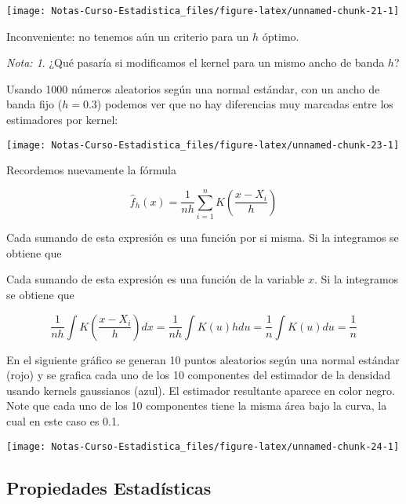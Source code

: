 \documentclass[
  12pt,
]{book}
\theoremstyle{definition}
\theoremstyle{definition}
\theoremstyle{definition}
\theoremstyle{definition}
\theoremstyle{remark}
\newtheorem*{remark}{Nota: }
\begin{document}
\begin{center}\texttt{[image: Notas-Curso-Estadistica\_files/figure-latex/unnamed-chunk-21-1]} \end{center}

Inconveniente: no tenemos aún un criterio para un \(h\) óptimo.

\begin{remark}
¿Qué pasaría si modificamos el kernel para un mismo ancho de banda \(h\)?
\end{remark}

Usando 1000 números aleatorios según una normal estándar, con un ancho de banda fijo (\(h=0.3\)) podemos ver que no hay diferencias muy marcadas entre los estimadores por kernel:

\begin{center}\texttt{[image: Notas-Curso-Estadistica\_files/figure-latex/unnamed-chunk-23-1]} \end{center}

Recordemos nuevamente la fórmula

\begin{equation*}
\hat{f}_{h}\left( x \right) = \frac{1}{nh}\sum_{i=1}^{n} K\left( \frac{x-X_{i}}{h} \right)
\end{equation*}

Cada sumando de esta expresión es una función por si misma. Si la
integramos se obtiene que

Cada sumando de esta expresión es una función de la variable \(x\). Si la integramos se obtiene que

\begin{equation*}
\frac{1}{nh}\int K\left( \frac{x-X_{i}}{h} \right) dx
= \frac{1}{nh} \int K\left( u \right) h du
= \frac{1}{n} \int K(u) du
= \frac{1}{n}
\end{equation*}

En el siguiente gráfico se generan 10 puntos aleatorios según una normal estándar (rojo) y se grafica cada uno de los 10 componentes del estimador de la densidad usando kernels gaussianos (azul). El estimador resultante aparece en color negro. Note que cada uno de los 10 componentes tiene la misma área bajo la curva, la cual en este caso es 0.1.

\begin{center}\texttt{[image: Notas-Curso-Estadistica\_files/figure-latex/unnamed-chunk-24-1]} \end{center}

\hypertarget{propiedades-estaduxedsticas-2}{%
\subsection{Propiedades Estadísticas}\label{propiedades-estaduxedsticas-2}}
\end{document}
